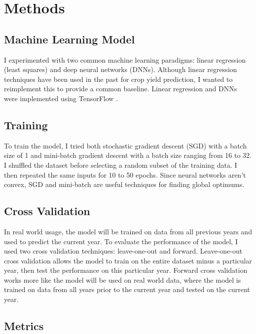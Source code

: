 \documentclass[letterpaper]{article}
\begin{document}
\section{Methods}

\subsection{Machine Learning Model}

I experimented with two common machine learning paradigms: linear regression (least squares) and deep neural networks (DNNs). Although linear regression techniques have been used in the past for crop yield prediction, I wanted to reimplement this to provide a common baseline. Linear regression and DNNs were implemented using TensorFlow \cite{tensorflow2015-whitepaper}.

\subsection{Training}

To train the model, I tried both stochastic gradient descent (SGD) with a batch size of 1 and mini-batch gradient descent with a batch size ranging from 16 to 32. I shuffled the dataset before selecting a random subset of the training data. I then repeated the same inputs for 10 to 50 epochs. Since neural networks aren't convex, SGD and mini-batch are useful techniques for finding global optimums.

\subsection{Cross Validation}

In real world usage, the model will be trained on data from all previous years and used to predict the current year. To evaluate the performance of the model, I used two cross validation techniques: leave-one-out and forward. Leave-one-out cross validation allows the model to train on the entire dataset minus a particular year, then test the performance on this particular year. Forward cross validation works more like the model will be used on real world data, where the model is trained on data from all years prior to the current year and tested on the current year.

\subsection{Metrics}
\end{document}
